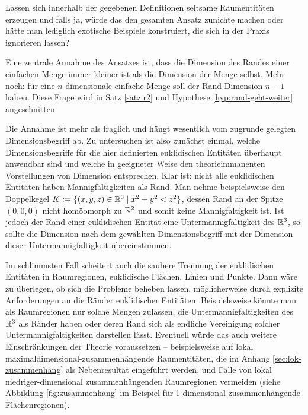     
    Lassen
    sich innerhalb der gegebenen Definitionen seltsame Raumentitäten erzeugen und falls ja, würde das den gesamten Ansatz zunichte machen oder hätte man lediglich exotische Beispiele konstruiert, die sich in der Praxis ignorieren lassen?
    
    Eine
    zentrale Annahme des Ansatzes ist, dass die Dimension des Randes einer einfachen Menge immer kleiner ist als die Dimension der Menge selbst. Mehr noch: für eine $n$-dimensionale einfache Menge soll der Rand Dimension $n-1$ haben.
    Diese Frage wird in Satz \ref{satz:r2} und Hypothese \ref{hyp:rand-geht-weiter} 
    angeschnitten.

    Die
    Annahme ist mehr als fraglich und hängt wesentlich vom zugrunde gelegten Dimensionsbegriff ab.
    Zu untersuchen ist also zunächst einmal, welche Dimensionsbegriffe für die hier definierten euklidischen Entitäten überhaupt anwendbar sind und welche in geeigneter Weise den theorieimmanenten Vorstellungen von Dimension entsprechen.
    Klar ist: nicht alle euklidischen Entitäten haben Mannigfaltigkeiten als Rand.
    Man nehme beispielsweise den Doppelkegel $K := \{(x,y,z) \in \mathbb{R}^3 \mid x^2+y^2 < z^2\}$, dessen Rand an der Spitze $(0,0,0)$ nicht homöomorph zu $\mathbb{R}^2$ und somit keine Mannigfaltigkeit ist.
    Ist jedoch der Rand einer euklidischen Entität eine Untermannigfaltigkeit des $\mathbb{R}^3$, so sollte die Dimension nach dem gewählten Dimensionsbegriff mit der Dimension dieser Untermannigfaltigkeit übereinstimmen.
    
    Im
    schlimmsten Fall scheitert auch die saubere Trennung der euklidischen Entitäten in Raumregionen, euklidische Flächen, Linien und Punkte.
    Dann wäre zu überlegen, ob sich die Probleme beheben lassen, möglicherweise durch explizite Anforderungen an die Ränder euklidischer Entitäten. 
    Beispielsweise könnte man als Raumregionen nur solche Mengen zulassen, die Untermannigfaltigkeiten des $\mathbb{R}^3$ als Ränder haben oder deren Rand sich als endliche Vereinigung solcher Untermannigfaltigkeiten darstellen lässt.
    Eventuell würde das auch weitere Einschränkungen der Theorie voraussetzen -- beispielsweise auf lokal maximaldimensional-zusammenhängende Raumentitäten, die im Anhang \ref{sec:lok-zusammenhang} als Nebenresultat eingeführt werden, und Fälle von lokal niedriger-dimensional zusammenhängenden Raumregionen vermeiden (siehe Abbildung \ref{fig:zusammenhang} im Beispiel für 1-dimensional zusammenhängende Flächenregionen).
    
